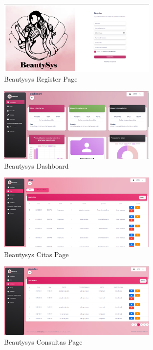 \documentclass{scrreprt}
\begin{document}
\begin{figure}[H]
    \centering
    \includegraphics[width=0.7\textwidth]{img/Register_page.png}
    \caption{Beautysys Register Page}
\end{figure}

\begin{figure}[H]
    \centering
    \includegraphics[width=0.7\textwidth]{img/home_page.png}
    \caption{Beautysys Dashboard} 
\end{figure}

\begin{figure}[H]
    \centering
    \includegraphics[width=0.7\textwidth]{img/citas_home.png}
    \caption{Beautysys Citas Page}
\end{figure}

\begin{figure}[H]
    \centering
    \includegraphics[width=0.7\textwidth]{img/Consultas_home.png}
    \caption{Beautysys Consultas Page}
\end{figure}
\end{document}
